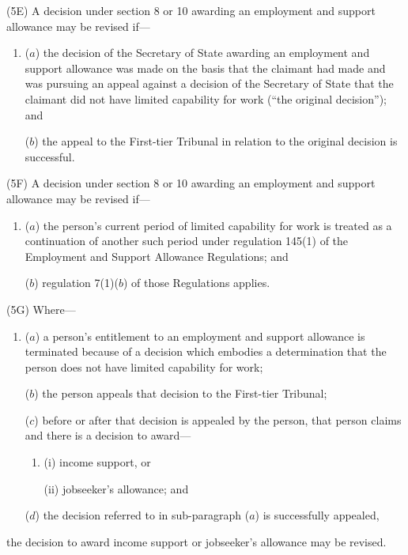 \documentclass[12pt,a4paper]{article}
\begin{document}
(5E) A decision under section 8 or 10 awarding an employment and support allowance may be revised if—
\begin{enumerate}\item[]
($a$) the decision of the Secretary of State awarding an employment and support allowance was made on the basis that the claimant had made and was pursuing an appeal against a decision of the Secretary of State that the claimant did not have limited capability for work (“the original decision”); and

($b$) the appeal to the First-tier Tribunal in relation to the original decision is successful.
\end{enumerate}

(5F) A decision under section 8 or 10 awarding an employment and support allowance may be revised if—
\begin{enumerate}\item[]
($a$) the person’s current period of limited capability for work is treated as a continuation of another such period under regulation 145(1) 
of the Employment and Support Allowance Regulations; and

($b$) regulation 7(1)($b$) of those Regulations applies.
\end{enumerate}

(5G) Where—
\begin{enumerate}\item[]
($a$) a person’s entitlement to an employment and support allowance is terminated because of a decision which embodies a determination that the person does not have limited capability for work;

($b$) the person appeals that decision to the First-tier Tribunal;

($c$) before or after that decision is appealed by the person, that person claims and there is a decision to award---
\begin{enumerate}\item[]
(i) income support, or

(ii) jobseeker’s allowance; and
\end{enumerate}

($d$) the decision referred to in sub-paragraph ($a$) is successfully appealed,
\end{enumerate}
the decision to award income support or jobseeker’s allowance may be revised.
\end{document}
